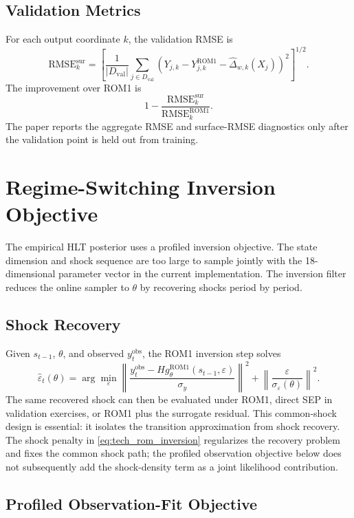 \documentclass[12pt]{article}
\newcommand{\eps}{\varepsilon}
\newcommand{\rom}{\mathrm{ROM1}}
\newcommand{\sur}{\mathrm{sur}}
\newcommand{\obs}{\mathrm{obs}}
\begin{document}
\subsection{Validation Metrics}

For each output coordinate \(k\), the validation RMSE is
\[
  \mathrm{RMSE}_k^{\sur}
  =
  \left[
    \frac{1}{|D_{\mathrm{val}}|}
    \sum_{j\in D_{\mathrm{val}}}
    \left(
      Y_{j,k}
      -
      Y^{\rom}_{j,k}
      -
      \widehat{\Delta}_{w,k}(X_j)
    \right)^2
  \right]^{1/2}.
\]
The improvement over ROM1 is
\[
  1-\frac{\mathrm{RMSE}^{\sur}_k}{\mathrm{RMSE}^{\rom}_k}.
\]
The paper reports the aggregate RMSE and surface-RMSE diagnostics only after
the validation point is held out from training.

\section{Regime-Switching Inversion Objective}
\label{apptech:inversion}

The empirical HLT posterior uses a profiled inversion objective. The state
dimension and shock sequence are too large to sample jointly with the
18-dimensional parameter vector in the current implementation. The inversion
filter reduces the online sampler to \(\theta\) by recovering shocks period by
period.

\subsection{Shock Recovery}

Given \(s_{t-1}\), \(\theta\), and observed \(y_t^{\obs}\), the ROM1 inversion
step solves
\begin{equation}
  \widehat{\eps}_t(\theta)
  =
  \arg\min_{\eps}
  \left\|
    \frac{y_t^{\obs}-H g^{\rom}_\theta(s_{t-1},\eps)}{\sigma_y}
  \right\|^2
  +
  \left\|
    \frac{\eps}{\sigma_\eps(\theta)}
  \right\|^2 .
\label{eq:tech_rom_inversion}
\end{equation}
The same recovered shock can then be evaluated under ROM1, direct SEP in
validation exercises, or ROM1 plus the surrogate residual. This common-shock
design is essential: it isolates the transition approximation from shock
recovery. The shock penalty in \eqref{eq:tech_rom_inversion} regularizes the
recovery problem and fixes the common shock path; the profiled observation
objective below does not subsequently add the shock-density term as a joint
likelihood contribution.

\subsection{Profiled Observation-Fit Objective}
\end{document}
